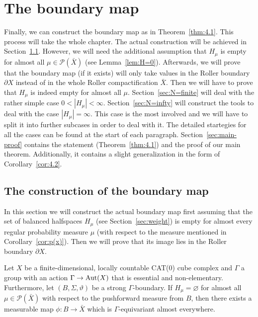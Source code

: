 \section{The boundary map}
\label{sec:map}

Finally, we can construct the boundary map as in Theorem~\ref{thm:4.1}. This process will take the whole chapter. The actual construction will be achieved in Section~\ref{sec:construction}. However, we will need the additional assumption that \(H_\mu\) is empty for almost all \(\mu \in \mathcal{P}(\bar X)\) (see Lemma~\ref{lem:H=0}). Afterwards, we will prove that the boundary map (if it exists) will only take values in the Roller boundary \(\partial X\) instead of in the whole Roller compactification \(\bar X\). Then we will have to prove that \(H_\mu\) is indeed empty for almost all \(\mu\). Section~\ref{sec:N=finite} will deal with the rather simple case \(0 < |H_\mu| < \infty\). Section~\ref{sec:N=infty} will construct the tools to deal with the case \(|H_\mu| = \infty\). This case is the most involved and we will have to split it into further subcases in order to deal with it. The detailed startegies for all the cases can be found at the start of each paragraph. Section~\ref{sec:main-proof} contains the statement (Theorem~\ref{thm:4.1}) and the proof of our main theorem. Additionally, it contains a slight generalization in the form of Corollary~\ref{cor:4.2}.

\subsection{The construction of the boundary map}
\label{sec:construction}
In this section we will construct the actual boundary map first assuming that the set of balanced halfspaces \(H_\mu\) (see Section~\ref{sec:weight}) is empty for almost every regular probability measure \(\mu\) (with respect to the measure mentioned in Corollary~\ref{cor:p(x)}). Then we will prove that its image lies in the Roller boundary \(\partial X\).

\begin{lemma}
  \label{lem:H=0}
  Let \(X\) be a finite-dimensional, locally countable CAT(0) cube complex and \(\Gamma\) a group with an action \(\Gamma \to \operatorname{Aut}(X)\) that is essential and non-elementary. Furthermore, let \((B,\Sigma,\vartheta)\) be a strong \(\Gamma\)-boundary. If \(H_\mu = \varnothing\) for almost all \(\mu \in \mathcal{P}(\bar X)\) with respect to the pushforward measure from \(B\), then there exists a measurable map \(\phi\colon B \to \bar X\) which is \(\Gamma\)-equivariant almost everywhere.
\end{lemma}

